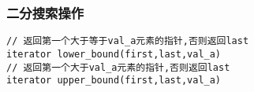\subsubsection{二分搜索操作}
\begin{lstlisting}
// 返回第一个大于等于val_a元素的指针,否则返回last
iterator lower_bound(first,last,val_a)
// 返回第一个大于val_a元素的指针,否则返回last
iterator upper_bound(first,last,val_a)
\end{lstlisting}